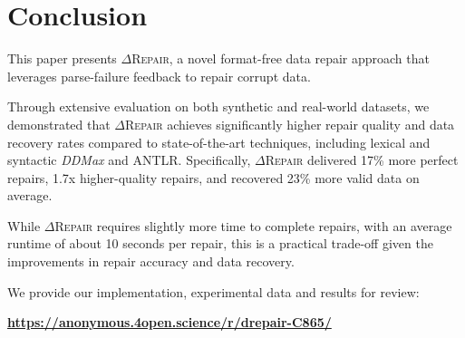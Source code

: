 \documentclass[acmsmall,screen,review,anonymous]{acmart}
\newcommand{\formatfree}{format-free\xspace}
\newcommand{\dtask}{data repair\xspace}
\newcommand{\approach}{\textsc{$\Delta$Repair}\xspace}
\newcommand{\ddmax}{\textit{DDMax}\xspace}
\newcommand{\drepair}{\approach}
\begin{document}
\section{Conclusion}
\label{sec:conclusion}

This paper presents \drepair, a novel \formatfree \dtask approach that
leverages parse-failure feedback to repair corrupt data.

Through extensive evaluation on both synthetic and real-world
datasets, we demonstrated that \drepair achieves significantly higher repair
quality and data recovery rates compared to state-of-the-art techniques,
including lexical and syntactic \ddmax and ANTLR. Specifically, \drepair
delivered 17\% more perfect repairs,
1.7x higher-quality repairs,
and recovered 23\% more valid data on average.

While \drepair requires slightly more time to complete repairs, with an average
runtime of about 10 seconds per repair, this is a practical trade-off given the
improvements in repair accuracy and data recovery.

We provide our implementation, experimental data and results for review:

\begin{center}
   \textbf{\url{https://anonymous.4open.science/r/drepair-C865/}} %
\end{center}




\end{document}
